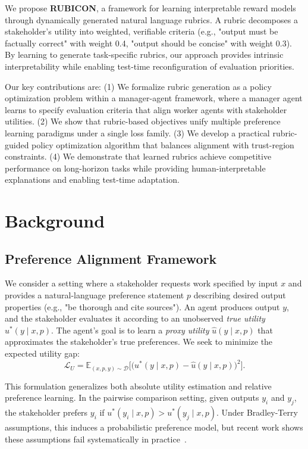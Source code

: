 \documentclass[sigconf]{acmart}
\begin{document}
We propose \textbf{RUBICON}, a framework for learning interpretable reward models through dynamically generated natural language rubrics. A rubric decomposes a stakeholder's utility into weighted, verifiable criteria (e.g., "output must be factually correct" with weight 0.4, "output should be concise" with weight 0.3). By learning to generate task-specific rubrics, our approach provides intrinsic interpretability while enabling test-time reconfiguration of evaluation priorities.

Our key contributions are: (1) We formalize rubric generation as a policy optimization problem within a manager-agent framework, where a manager agent learns to specify evaluation criteria that align worker agents with stakeholder utilities. (2) We show that rubric-based objectives unify multiple preference learning paradigms under a single loss family. (3) We develop a practical rubric-guided policy optimization algorithm that balances alignment with trust-region constraints. (4) We demonstrate that learned rubrics achieve competitive performance on long-horizon tasks while providing human-interpretable explanations and enabling test-time adaptation.


\section{Background}

\subsection{Preference Alignment Framework}

We consider a setting where a stakeholder requests work specified by input \(x\) and provides a natural-language preference statement \(p\) describing desired output properties (e.g., "be thorough and cite sources"). An agent produces output \(y\), and the stakeholder evaluates it according to an unobserved \emph{true utility} \(u^*(y \mid x, p)\). The agent's goal is to learn a \emph{proxy utility} \(\hat{u}(y \mid x, p)\) that approximates the stakeholder's true preferences. We seek to minimize the expected utility gap:
\begin{equation}
\mathcal{L}_U = \mathbb{E}_{(x,p,y) \sim \mathcal{D}}\Big[\big(u^*(y \mid x,p) - \hat{u}(y \mid x,p)\big)^2\Big].
\label{eq:utility-gap}
\end{equation}

This formulation generalizes both absolute utility estimation and relative preference learning. In the pairwise comparison setting, given outputs \(y_i\) and \(y_j\), the stakeholder prefers \(y_i\) if \(u^*(y_i \mid x,p) > u^*(y_j \mid x,p)\). Under Bradley-Terry assumptions, this induces a probabilistic preference model, but recent work shows these assumptions fail systematically in practice~\cite{bt_critique2024}.
\end{document}
